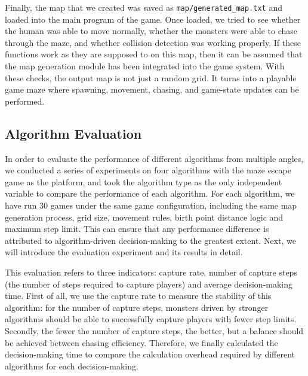 \documentclass[12pt,a4paper]{article}
\begin{document}
Finally, the map that we created was saved as \texttt{map/generated\_map.txt} and loaded into the main program of the game. Once loaded, we tried to see whether the human was able to move normally, whether the monsters were able to chase through the maze, and whether collision detection was working properly. If these functions work as they are supposed to on this map, then it can be assumed that the map generation module has been integrated into the game system. With these checks, the output map is not just a random grid. It turns into a playable game maze where spawning, movement, chasing, and game-state updates can be performed.
\subsection{Algorithm Evaluation}

In order to evaluate the performance of different algorithms from multiple angles, we conducted a series of experiments on four algorithms with the maze escape game as the platform, and took the algorithm type as the only independent variable to compare the performance of each algorithm. For each algorithm, we have run 30 games under the same game configuration, including the same map generation process, grid size, movement rules, birth point distance logic and maximum step limit. This can ensure that any performance difference is attributed to algorithm-driven decision-making to the greatest extent. Next, we will introduce the evaluation experiment and its results in detail. 

This evaluation refers to three indicators: capture rate, number of capture steps (the number of steps required to capture players) and average decision-making time. First of all, we use the capture rate to measure the stability of this algorithm: for the number of capture steps, monsters driven by stronger algorithms should be able to successfully capture players with fewer step limits. Secondly, the fewer the number of capture steps, the better, but a balance should be achieved between chasing efficiency. Therefore, we finally calculated the decision-making time to compare the calculation overhead required by different algorithms for each decision-making.
\end{document}
